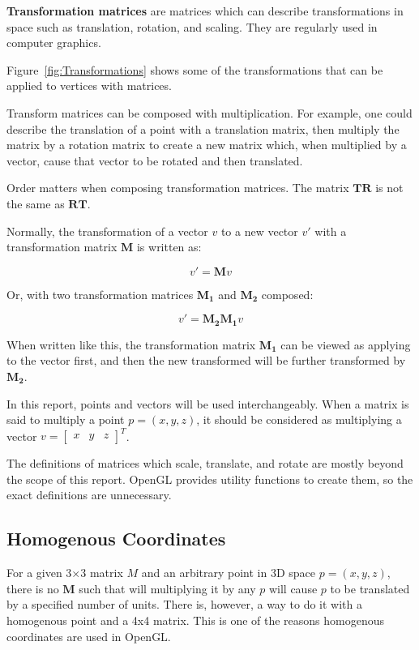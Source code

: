 \textbf{Transformation matrices} are matrices which can describe transformations in space such as translation, rotation, and scaling. They are regularly used in computer graphics. 

Figure~\ref{fig:Transformations} shows some of the transformations that can be applied to vertices with matrices.

Transform matrices can be composed with multiplication. For example, one could describe the translation of a point with a translation matrix, then multiply the matrix by a rotation matrix to create a new matrix which, when multiplied by a vector, cause that vector to be rotated and then translated.

Order matters when composing transformation matrices. The matrix $\mathbf{T} \mathbf{R}$ is not the same as $\mathbf{R} \mathbf{T}$.

Normally, the transformation of a vector $v$ to a new vector $v'$ with a transformation matrix $\mathbf{M}$ is written as:

\[ v' = \mathbf{M} v \]

Or, with two transformation matrices $\mathbf{M_1}$ and $\mathbf{M_2}$ composed:

\[ v' = \mathbf{M_2} \mathbf{M_1} v \]

When written like this, the transformation matrix $\mathbf{M_1}$ can be viewed as applying to the vector first, and then the new transformed will be further transformed by $\mathbf{M_2}$.

In this report, points and vectors will be used interchangeably. When a matrix is said to multiply a point $p = (x, y, z)$, it should be considered as multiplying a vector $v = \begin{bmatrix}x & y & z\end{bmatrix}^T $. 

The definitions of matrices which scale, translate, and rotate are mostly beyond the scope of this report. OpenGL provides utility functions to create them, so the exact definitions are unnecessary.

\subsection{Homogenous Coordinates}
For a given 3$\times$3 matrix $M$ and an arbitrary point in 3D space $p = (x, y, z)$, there is no $\mathbf{M}$ such that will multiplying it by any $p$ will cause $p$ to be translated by a specified number of units. There is, however, a way to do it with a homogenous point and a 4x4 matrix. This is one of the reasons homogenous coordinates are used in OpenGL.

